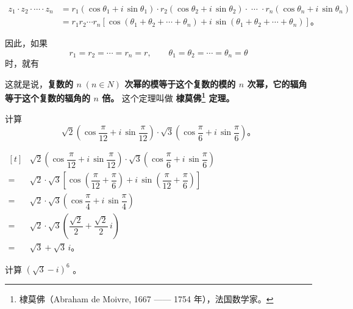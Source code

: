 \begin{align*}
    z_1 \cdot z_2 \cdot \cdots \cdot z_n &= r_1 (\cos\theta_1 + i \, \sin\theta_1) \cdot r_2 (\cos\theta_2 + i \, \sin\theta_2) \cdot \; \cdots \; \cdot r_n (\cos\theta_n + i \, \sin\theta_n) \\
    &= r_1 r_2 \cdots r_n [\cos(\theta_1 + \theta_2 + \cdots + \theta_n) + i \, \sin(\theta_1 + \theta_2 + \cdots + \theta_n) ] \text{。}
\end{align*}

因此，如果
$$ r_1 = r_2 = \cdots = r_n = r , \qquad \theta_1 = \theta_2 = \cdots = \theta_n = \theta $$
时，就有
\begin{center}
\end{center}

这就是说，\textbf{复数的 $n \; (n \in N)$ 次幂的模等于这个复数的模的 $n$ 次幂，它的辐角等于这个复数的辐角的 $n$ 倍。}
这个定理叫做 \textbf{棣莫佛\footnote{棣莫佛（Abraham de Moivre, 1667 —— 1754 年），法国数学家。} 定理。}


\liti 计算
$$ \sqrt{2} \left( \cos\dfrac{\pi}{12} + i\, \sin\dfrac{\pi}{12} \right) \cdot \sqrt{3} \left( \cos\dfrac{\pi}{6} + i\, \sin\dfrac{\pi}{6} \right) \text{。} $$

\jie $\begin{aligned}[t]
        & \sqrt{2} \left( \cos\dfrac{\pi}{12} + i\, \sin\dfrac{\pi}{12} \right) \cdot \sqrt{3} \left( \cos\dfrac{\pi}{6} + i\, \sin\dfrac{\pi}{6} \right) \\
    ={} & \sqrt{2} \cdot \sqrt{3} \left[ \cos\left( \dfrac{\pi}{12} + \dfrac{\pi}{6} \right) + i\, \sin\left( \dfrac{\pi}{12} + \dfrac{\pi}{6} \right) \right] \\
    ={} & \sqrt{2} \cdot \sqrt{3} \left( \cos\dfrac{\pi}{4} + i\, \sin\dfrac{\pi}{4} \right) \\
    ={} & \sqrt{2} \cdot \sqrt{3} \left( \dfrac{\sqrt{2}}{2} + \dfrac{\sqrt{2}}{2} \, i \right) \\
    ={} & \sqrt{3} + \sqrt{3} \, i \text{。}
\end{aligned}$



\liti 计算 $(\sqrt{3} - i)^6$ 。

